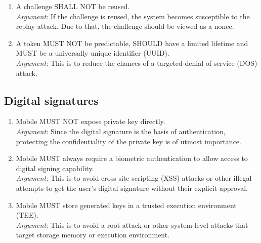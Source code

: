 \begin{enumerate}
            \item A challenge SHALL NOT be reused.\\
            \textit{Argument:} If the challenge is reused, the system becomes susceptible to the replay attack. 
                               Due to that, the challenge should be viewed as a nonce.

            \item A token MUST NOT be predictable, SHOULD have a limited lifetime and MUST be a universally unique
                  identifier (UUID).\\
            \textit{Argument:} This is to reduce the chances of a targeted denial of service (DOS) attack.
        \end{enumerate}

    \subsection{Digital signatures}
        \begin{enumerate}[resume]
            \item Mobile MUST NOT expose private key directly.\\
            \textit{Argument:} Since the digital signature is the basis of authentication, protecting the 
                               confidentiality of the private key is of utmost importance.                               

            \item Mobile MUST always require a biometric authentication to allow access to digital signing 
                  capability.\\        
            \textit{Argument:} This is to avoid cross-site scripting (XSS) attacks or other illegal attempts to 
                               get the user's digital signature without their explicit approval.

            \item Mobile MUST store generated keys in a trusted execution environment (TEE).\\        
            \textit{Argument:} This is to avoid a root attack or other system-level attacks that target storage 
                               memory or execution environment.
        \end{enumerate}

